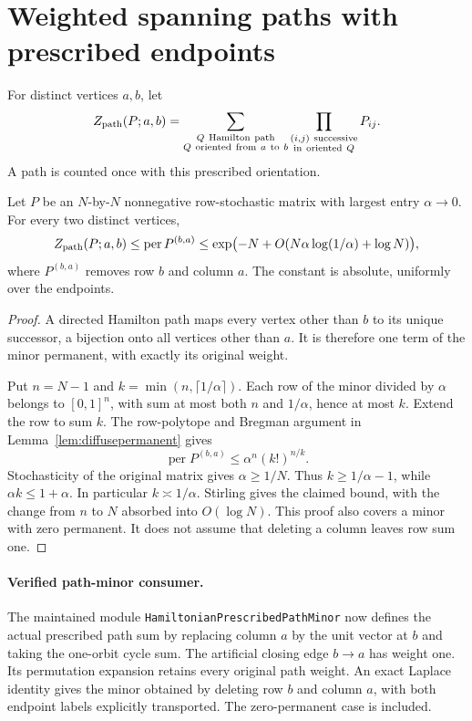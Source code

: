 \section{Weighted spanning paths with prescribed endpoints}
\label{sec:pathentropy}
For distinct vertices \(a,b\), let
\[
 Z_{\rm path}(P;a,b)
  =\sum_{\substack{Q\ {\rm Hamilton\ path}\\
                       Q\ {\rm oriented\ from}\ a\ {\rm to}\ b}}
               \prod_{\substack{(i,j)\ {\rm successive}\\
                                 {\rm in\ oriented}\ Q}}P_{ij}.
\]
A path is counted once with this prescribed orientation.

\begin{lemma}
\label{lem:pathminor}
Let \(P\) be an \(N\)-by-\(N\) nonnegative row-stochastic
matrix with largest entry \(\alpha\to0\).
For every two distinct vertices,
\[
 Z_{\rm path}(P;a,b)
 \leq\operatorname{per}P^{(b,a)}
 \leq\exp\bigl(-N+
       O(N\alpha\log(1/\alpha)+\log N)\bigr),
\]
where \(P^{(b,a)}\) removes row \(b\) and column \(a\).
The constant is absolute, uniformly over the endpoints.
\end{lemma}
\begin{proof}
A directed Hamilton path maps every vertex other than \(b\)
to its unique successor, a bijection onto all vertices
other than \(a\). It is therefore one term of the minor
permanent, with exactly its original weight.

Put \(n=N-1\) and \(k=\min(n,\lceil1/\alpha\rceil)\).
Each row of the minor divided by \(\alpha\) belongs to
\([0,1]^n\), with sum at most both \(n\) and \(1/\alpha\),
hence at most \(k\).
Extend the row to sum \(k\).
The row-polytope and Bregman argument in
Lemma~\ref{lem:diffusepermanent} gives
\[
 \operatorname{per}P^{(b,a)}
               \leq\alpha^n(k!)^{n/k}.
\]
Stochasticity of the original matrix gives \(\alpha\geq1/N\).
Thus \(k\geq1/\alpha-1\), while \(\alpha k\leq1+\alpha\).
In particular \(k\asymp1/\alpha\).
Stirling gives the claimed bound, with the change from
\(n\) to \(N\) absorbed into \(O(\log N)\).
This proof also covers a minor with zero permanent.
It does not assume that deleting a column leaves row sum one.
\end{proof}

\paragraph{Verified path-minor consumer.}
The maintained module
\texttt{HamiltonianPrescribedPathMinor} now defines the actual prescribed
path sum by replacing column \(a\) by the unit vector at \(b\) and taking
the one-orbit cycle sum. The artificial closing edge \(b\to a\) has weight
one. Its permutation expansion retains every original path weight.
An exact Laplace identity gives the minor obtained by deleting row \(b\)
and column \(a\), with both endpoint labels explicitly transported.
The zero-permanent case is included.

